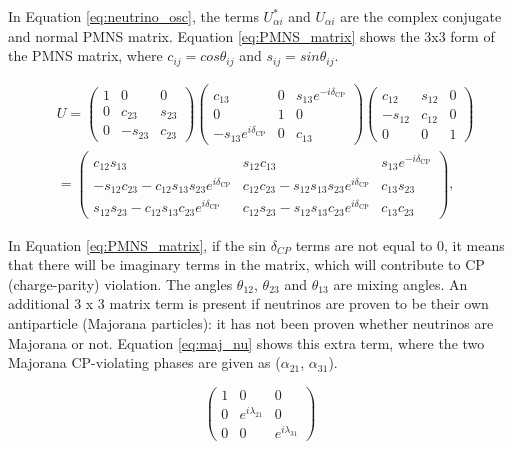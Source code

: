 In Equation \ref{eq:neutrino_osc}, the terms $U_{\alpha i}^{*}$ and $U_{\alpha i}$ are the complex conjugate and normal PMNS matrix. Equation \ref{eq:PMNS_matrix} shows the 3x3 form of the PMNS matrix, where $c_{ij} = cos {\theta_{ij}}$ and $s_{ij} = sin {\theta_{ij}}$.

$$
\begin{aligned}
&U=\left(\begin{array}{ccc}
1 & 0 & 0 \\
0 & c_{23} & s_{23} \\
0 & -s_{23} & c_{23}
\end{array}\right)\left(\begin{array}{ccc}
c_{13} & 0 & s_{13} e^{-i \delta_{\mathrm{CP}}} \\
0 & 1 & 0 \\
-s_{13} e^{i \delta_{\mathrm{CP}}} & 0 & c_{13}
\end{array}\right)\left(\begin{array}{ccc}
c_{12} & s_{12} & 0 \\
-s_{12} & c_{12} & 0 \\
0 & 0 & 1
\end{array}\right)\\
&=\left(\begin{array}{ccc}
c_{12} s_{13} & s_{12} c_{13} & s_{13} e^{-i \delta_{\mathrm{CP}}} \\
-s_{12} c_{23}-c_{12} s_{13} s_{23} e^{i \delta_{\mathrm{CP}}} & c_{12} c_{23}-s_{12} s_{13} s_{23} e^{i \delta_{\mathrm{CP}}} & c_{13} s_{23} \\
s_{12} s_{23}-c_{12} s_{13} c_{23} e^{i \delta_{\mathrm{CP}}} & c_{12} s_{23}-s_{12} s_{13} c_{23} e^{i \delta_{\mathrm{CP}}} & c_{13} c_{23}
\end{array}\right),
\end{aligned}
\label{eq:PMNS_matrix}
$$

In Equation \ref{eq:PMNS_matrix}, if the sin $\delta_{CP}$ terms are not equal to 0, it means that there will be imaginary terms in the matrix, which will contribute to CP (charge-parity) violation. The angles $\theta_{12}$, $\theta_{23}$ and $\theta_{13}$ are mixing angles. An additional 3 x 3 matrix term is present if neutrinos are proven to be their own antiparticle (Majorana particles): it has not been proven whether neutrinos are Majorana or not. Equation \ref{eq:maj_nu} shows this extra term, where the two Majorana CP-violating phases are given as ($\alpha_{21}$, $\alpha_{31}$). 

$$
\left(\begin{array}{ccc}
1 & 0 & 0 \\
0 & e^{i \lambda_{21}} & 0 \\
0 & 0 & e^{i \lambda_{31}}
\end{array}\right)
\label{eq:maj_nu}
$$


